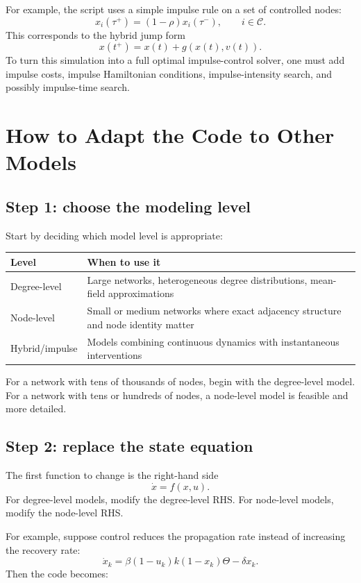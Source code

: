 \documentclass[11pt,a4paper]{article}
\begin{document}
For example, the script uses a simple impulse rule on a set of controlled nodes:
\[
  x_i(\tau^+)=(1-\rho)x_i(\tau^-),
  \qquad i\in\mathcal{C}.
\]
This corresponds to the hybrid jump form
\[
  x(t^+)=x(t)+g(x(t),v(t)).
\]
To turn this simulation into a full optimal impulse-control solver, one must add impulse costs, impulse Hamiltonian conditions, impulse-intensity search, and possibly impulse-time search.

\section{How to Adapt the Code to Other Models}

\subsection{Step 1: choose the modeling level}

Start by deciding which model level is appropriate:

\begin{center}
\begin{tabularx}{0.95\linewidth}{@{}lX@{}}
\toprule
Level & When to use it \\
\midrule
Degree-level & Large networks, heterogeneous degree distributions, mean-field approximations \\
Node-level & Small or medium networks where exact adjacency structure and node identity matter \\
Hybrid/impulse & Models combining continuous dynamics with instantaneous interventions \\
\bottomrule
\end{tabularx}
\end{center}

For a network with tens of thousands of nodes, begin with the degree-level model. For a network with tens or hundreds of nodes, a node-level model is feasible and more detailed.

\subsection{Step 2: replace the state equation}

The first function to change is the right-hand side
\[
  \dot{x}=f(x,u).
\]
For degree-level models, modify the degree-level RHS. For node-level models, modify the node-level RHS.

For example, suppose control reduces the propagation rate instead of increasing the recovery rate:
\[
  \dot{x}_k
  =\beta(1-u_k)k(1-x_k)\Theta-\delta x_k.
\]
Then the code becomes:
\end{document}
